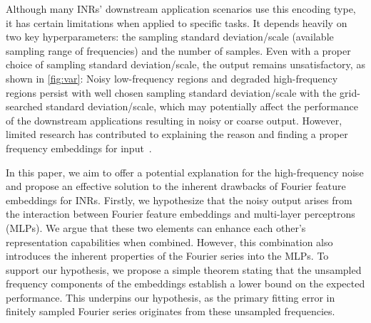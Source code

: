 Although many INRs' downstream application scenarios use this encoding type, it has certain limitations when applied to specific tasks.
%
It depends heavily on two key hyperparameters: the sampling standard deviation/scale (available sampling range of frequencies) and the number of samples.
%
Even with a proper choice of sampling standard deviation/scale, the output remains unsatisfactory, as shown in \autoref{fig:var}: Noisy low-frequency regions and degraded high-frequency regions persist with well chosen sampling standard deviation/scale with the grid-searched standard deviation/scale, which may potentially affect the performance of the downstream applications resulting in noisy or coarse output.
%
However, limited research has contributed to explaining the reason and finding a proper frequency embeddings for input~\citep{landgraf2022pins, yuce2022structured}.

In this paper, we aim to offer a potential explanation for the high-frequency noise and propose an effective solution to the inherent drawbacks of Fourier feature embeddings for INRs.
%
Firstly, we hypothesize that the noisy output arises from the interaction between Fourier feature embeddings and multi-layer perceptrons (MLPs). We argue that these two elements can enhance each other's representation capabilities when combined. However, this combination also introduces the inherent properties of the Fourier series into the MLPs.
%
To support our hypothesis, we propose a simple theorem stating that the unsampled frequency components of the embeddings establish a lower bound on the expected performance. This underpins our hypothesis, as the primary fitting error in finitely sampled Fourier series originates from these unsampled frequencies.

